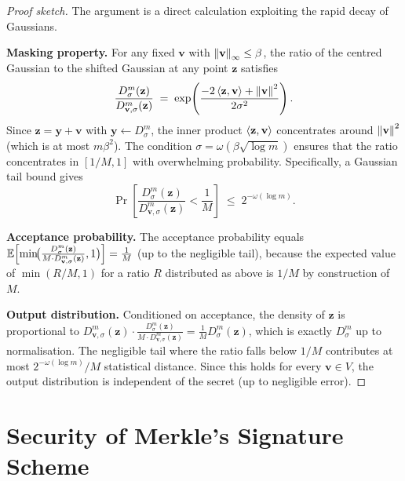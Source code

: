 \begin{proof}[Proof sketch]
The argument is a direct calculation exploiting the rapid
decay of Gaussians.

\medskip\noindent\textbf{Masking property.}
For any fixed $\mathbf{v}$ with
$\left\lVert \mathbf{v} \right\rVert_\infty \leq \beta$, the ratio of the
centred Gaussian to the shifted Gaussian at any point
$\mathbf{z}$ satisfies
\begin{equation}
\frac{D_\sigma^m(\mathbf{z})}{D_{\mathbf{v},\sigma}^m(\mathbf{z})}
\;=\; \exp\!\left(
  \frac{-2\left\langle \mathbf{z}, \mathbf{v} \right\rangle +
  \left\lVert \mathbf{v} \right\rVert^2}{2\sigma^2}\right).
\end{equation}
Since $\mathbf{z} = \mathbf{y} + \mathbf{v}$ with
$\mathbf{y} \leftarrow D_\sigma^m$, the inner product
$\left\langle \mathbf{z}, \mathbf{v} \right\rangle$ concentrates around
$\left\lVert \mathbf{v} \right\rVert^2$ (which is at most $m\beta^2$).
The condition $\sigma = \omega(\beta\sqrt{\log m})$
ensures that the ratio concentrates in $[1/M, 1]$ with
overwhelming probability.  Specifically, a Gaussian tail
bound gives
\begin{equation}
\Pr\!\left[
  \frac{D_\sigma^m(\mathbf{z})}{D_{\mathbf{v},\sigma}^m(\mathbf{z})}
  < \frac{1}{M}\right]
\;\leq\; 2^{-\omega(\log m)}.
\end{equation}

\medskip\noindent\textbf{Acceptance probability.}
The acceptance probability equals
$\operatorname{\mathbb{E}}\!\left[\min\!\bigl(
\frac{D_\sigma^m(\mathbf{z})}{M \cdot D_{\mathbf{v},\sigma}^m(\mathbf{z})}, 1
\bigr)\right] = \frac{1}{M}$
(up to the negligible tail), because the expected value of
$\min(R/M, 1)$ for a ratio $R$ distributed as above is
$1/M$ by construction of~$M$.

\medskip\noindent\textbf{Output distribution.}
Conditioned on acceptance, the density of $\mathbf{z}$ is
proportional to
$D_{\mathbf{v},\sigma}^m(\mathbf{z}) \cdot
\frac{D_\sigma^m(\mathbf{z})}{M \cdot D_{\mathbf{v},\sigma}^m(\mathbf{z})}
= \frac{1}{M} D_\sigma^m(\mathbf{z})$,
which is exactly $D_\sigma^m$ up to normalisation.  The
negligible tail where the ratio falls below $1/M$ contributes
at most $2^{-\omega(\log m)}/M$ statistical distance.
Since this holds for every $\mathbf{v} \in V$, the output
distribution is independent of the secret (up to negligible
error).
\end{proof}


\section{Security of Merkle's Signature Scheme}
\label{app:merkle-security}

